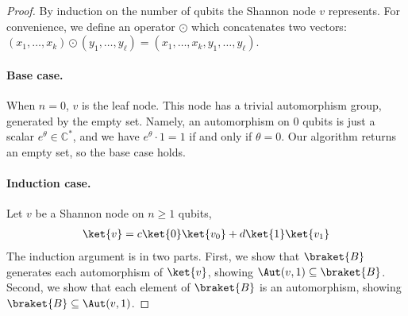 \begin{proof}
	By induction on the number of qubits the Shannon node $v$ represents.
	For convenience, we define an operator $\odot$ which concatenates two vectors: $(x_1,\ldots, x_k)\odot(y_1,\ldots, y_\ell)=(x_1,\ldots, x_k,y_1,\ldots, y_\ell)$.
	
	\paragraph{Base case.}
	When $n=0$, $v$ is the \textsf{leaf} node.
	This node has a trivial automorphism group, generated by the empty set.
	Namely, an automorphism on $0$ qubits is just a scalar $e^\theta\in \mathbb C^\ast$, and we have $e^\theta\cdot 1=1$ if and only if $\theta=0$.
	Our algorithm returns an empty set, so the base case holds.
	
	\paragraph{Induction case.} Let $v$ be a Shannon node on $n\geq 1$ qubits,
	\begin{align}
		\ket{v} = c\ket{0}\ket{v_0}+d\ket{1}\ket{v_1}
	\end{align}
	The induction argument is in two parts.
	First, we show that $\braket{B}$ generates each automorphism of $\ket{v}$, showing $\Aut(v,1)\subseteq \braket{B}$.
	Second, we show that each element of $\braket{B}$ is an automorphism, showing $\braket{B}\subseteq \Aut(v,1)$.
	

\end{proof}
